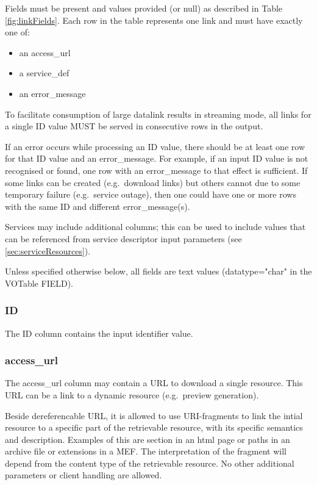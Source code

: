 \documentclass[11pt,a4paper]{ivoa}
\newcommand{\attval}[2]{#1={\allowbreak}{"}#2{"}}
\begin{document}
Fields must be present and values provided
(or null) as described in Table \ref{fig:linkFields}. Each row in the table
represents one link and must have exactly one of:
\begin{itemize}
  \item an access\_url
  \item a service\_def
  \item an error\_message
\end{itemize}

To facilitate consumption of large datalink results in streaming mode, all links 
for a single ID value MUST be served in consecutive rows in the output.

If an error occurs while processing an ID value, there should be at least
one row for that ID value and an error\_message. For example, if an input
ID value is not recognised or found, one row with an error\_message
to that effect is sufficient.
If some links can be created (e.g.\ download links)
but others cannot due to some temporary failure (e.g.\ service outage),
then one could have one or more rows with the same ID and different
error\_message(s).

Services may include additional columns; this can be used to include
values that can be referenced from service descriptor input parameters
(see \ref{sec:serviceResources}).

Unless specified otherwise below, all fields are text values (\attval{datatype}{char} 
in the VOTable FIELD).

\subsubsection{ID}

The ID column contains the input identifier value.


\subsubsection{access\_url}

The access\_url column may contain a URL to download a single resource.
This URL can be a link to a dynamic resource (e.g.\ preview generation).

Beside dereferencable URL, it is allowed to use URI-fragments to link
the intial resource to a specific part of the retrievable resource, with
its specific semantics and description. Examples of this are section
in an html page or paths in an archive file or extensions in a MEF.
The interpretation of the fragment will depend from the content type
of the retrievable resource.  No other additional parameters or client
handling are allowed.
\end{document}
